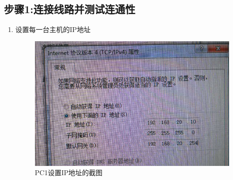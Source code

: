 \documentclass{myreport}
\begin{document}
\subsection{步骤1:连接线路并测试连通性}

\begin{enumerate}
    \item 设置每一台主机的IP地址
    \begin{figure}[htp]
        \centering
        \includegraphics[width=13cm]{"./figure/2018-05-17-22-31-49.png"}
        \caption{PC1设置IP地址的截图}
        \label{fig:e2-s2-set-ip}
    \end{figure}
    

\end{enumerate}
\end{document}
